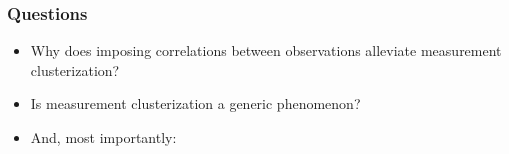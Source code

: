 \documentclass{beamer}
\begin{document}
\begin{frame}
\begin{columns}
\begin{column}{0.55\textwidth}
    \end{column}
  \end{columns}  
\end{frame}



\begin{frame}
\frametitle{Questions}
\begin{itemize}
\item<2-> Why does imposing correlations between observations alleviate
measurement clusterization?
%
\item<3-> Is measurement clusterization a generic phenomenon?
%
\item<4-> And, most importantly: 
\end{itemize}
\end{frame}
\end{document}
